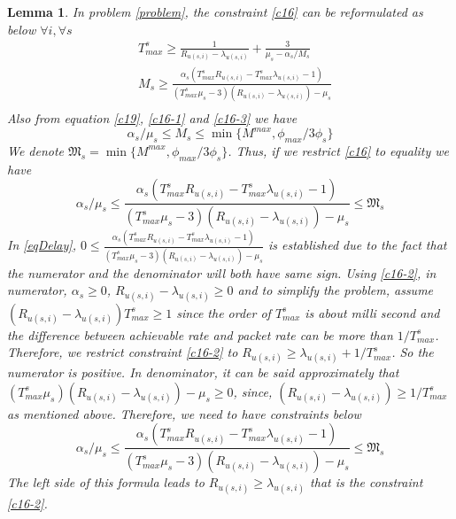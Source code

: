 \documentclass[conference]{IEEEtran}
\newtheorem{lemma}{Lemma}
\begin{document}
\begin{lemma}
In problem \eqref{problem}, the constraint \eqref{c16} can be reformulated as below
$ \forall i,\forall s$
\begin{equation}
\begin{split}
&T_{max}^s \geq\frac{1}{R_{u(s,i)} - \lambda_{u(s,i)}} + \frac{3}{\mu_s - \alpha_{s}/{M_s}}  \\
&M_s \geq \frac{\alpha_s(T_{max}^s R_{u(s,i)}-T_{max}^s\lambda_{u(s,i)} -1)}{(T_{max}^s\mu_s-3)(R_{u(s,i)}-\lambda_{u(s,i)}) - \mu_s }\\
\end{split}
\end{equation}
Also from equation \eqref{c19}, \eqref{c16-1} and \eqref{c16-3} we have
\begin{equation}
\alpha_s/\mu_s\leq M_s \leq \min\{M^{max}, \phi_{max}/{3\phi_s}\}
\end{equation}
We denote $ \mathfrak{M}_s= \min\{M^{max}, \phi_{max}/{3\phi_s}\}$.
Thus, if we restrict \eqref{c16} to equality we have
\begin{equation}\label{eqDelay}
\alpha_s/\mu_s\leq \frac{\alpha_s(T_{max}^s R_{u(s,i)}-T_{max}^s\lambda_{u(s,i)} -1)}{(T_{max}^s\mu_s-3)(R_{u(s,i)}-\lambda_{u(s,i)}) - \mu_s } \leq \mathfrak{M}_s
\end{equation}
In \eqref{eqDelay}, $0\leq \frac{\alpha_s(T_{max}^s R_{u(s,i)}-T_{max}^s\lambda_{u(s,i)} -1)}{(T_{max}^s\mu_s-3)(R_{u(s,i)}-\lambda_{u(s,i)}) - \mu_s }$ is established due to the fact that 
the numerator and the denominator will both have same sign. Using \eqref{c16-2},
in numerator, $\alpha_s \geq 0$, $ R_{u(s,i)}-\lambda_{u(s,i)} \geq 0$ and to simplify the problem, assume 
$(R_{u(s,i)}-\lambda_{u(s,i)})T_{max}^s \geq 1$ since the order of $T_{max}^s$ is about milli second and the difference between achievable rate and packet rate can be more than $1/T_{max}^s$.
Therefore, we restrict constraint \eqref{c16-2} to $R_{u(s,i)} \geq \lambda_{u(s,i)} + 1/T_{max}^s$.
So the numerator is positive.
In denominator, it can be said approximately that $(T_{max}^s\mu_s)(R_{u(s,i)}-\lambda_{u(s,i)}) - \mu_s \geq 0 $, since, $(R_{u(s,i)}-\lambda_{u(s,i)}) \geq 1/T_{max}^s$ as mentioned above.
Therefore, we need to have constraints below
\begin{equation}\label{constraint16}
\alpha_s/\mu_s\leq \frac{\alpha_s(T_{max}^s R_{u(s,i)}-T_{max}^s\lambda_{u(s,i)} -1)}{(T_{max}^s\mu_s-3)(R_{u(s,i)}-\lambda_{u(s,i)}) - \mu_s } \leq \mathfrak{M}_s
\end{equation}
The left side of this formula leads to $R_{u(s,i)} \geq \lambda_{u(s,i)}$ that is the constraint \eqref{c16-2}. 

\end{lemma}
\end{document}

